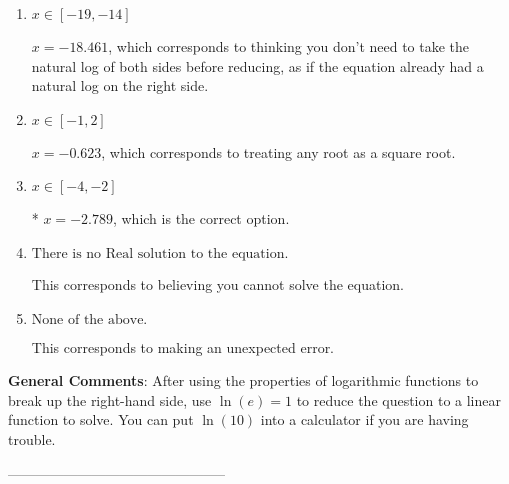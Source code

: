 \documentclass{extbook}[14pt]
\begin{document}
\begin{enumerate}[label=\Alph*.] 
\item $ x \in [-19, -14] $ 

 $x = -18.461$, which corresponds to thinking you don't need to take the natural log of both sides before reducing, as if the equation already had a natural log on the right side. 
\item $ x \in [-1, 2] $ 

 $x = -0.623$, which corresponds to treating any root as a square root. 
\item $ x \in [-4, -2] $ 

 * $x = -2.789$, which is the correct option. 
\item $ \text{There is no Real solution to the equation.} $ 

 This corresponds to believing you cannot solve the equation. 
\item $ \text{None of the above.} $ 

 This corresponds to making an unexpected error. 
\end{enumerate} 
 
\textbf{General Comments}: After using the properties of logarithmic functions to break up the right-hand side, use $\ln(e) = 1$ to reduce the question to a linear function to solve. You can put $\ln(10)$ into a calculator if you are having trouble.

-----------------------------------------------
\end{document}
